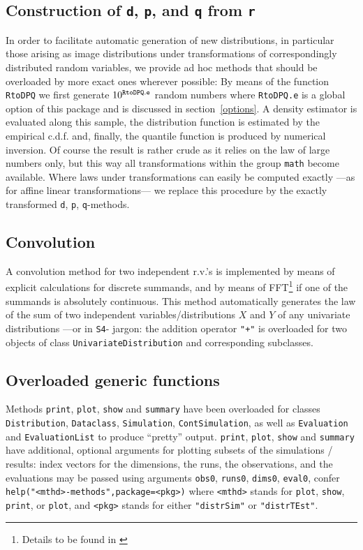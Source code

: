 \documentclass[11pt]{article}
\newcommand{\code}[1]{{\tt #1}}
\newcommand{\pkg}[1]{{\tt "#1"}}
\begin{document}
%
\subsection{Construction of \code{d}, \code{p}, and \code{q} from \code{r}}
%
In order to facilitate automatic generation of new distributions, in particular those
arising as image distributions under transformations of correspondingly distributed
random variables, we provide ad hoc methods that should be overloaded by more exact ones
wherever possible: By means of the function \code{RtoDPQ} we first generate $10^{\footnotesize\tt RtoDPQ.e}$
random numbers where \code{RtoDPQ.e} is a global option of this package and is discussed
in section~{\ref{options}}. %
A density estimator is evaluated along this sample, the distribution function is estimated
by the empirical c.d.f. and, finally, the quantile function is produced by numerical inversion.
Of course the result is rather crude as it relies on the law of large numbers only,
but this way all transformations within the group \code{math} become available.
Where laws under transformations can easily be computed exactly ---as for affine
linear transformations--- we replace this procedure by the exactly transformed
\code{d}, \code{p}, \code{q}-methods.
%
\subsection{Convolution}
%
A convolution method for two independent r.v.'s is implemented by means of explicit
calculations for discrete summands, and by means of FFT\footnote{Details to be found
in \cite{K:R:S:04}} if one of the summands is absolutely continuous.
This method automatically generates the law of the sum of two independent variables/distributions $X$ and $Y$
of any univariate distributions ---or in {\tt S4}-
jargon: the addition operator \code{"+"} is overloaded for two objects of class \code{UnivariateDistribution}
and corresponding subclasses.
%
\subsection{Overloaded generic functions}
Methods \code{print}, \code{plot}, \code{show} and \code{summary} have been overloaded for
classes \code{Distribution}, \code{Dataclass}, \code{Simulation}, \code{ContSimulation},
as well as \code{Evaluation} and \code{EvaluationList} to produce ``pretty'' 
output. %
\code{print}, \code{plot}, \code{show} and \code{summary} have additional, optional arguments
for plotting subsets of the simulations / results:
index vectors for the dimensions, the runs, the observations, and the evaluations may be passed using
arguments \code{obs0},  \code{runs0}, \code{dims0}, \code{eval0}, confer
\code{help("<mthd>-methods",package=<pkg>)} where \code{<mthd>} stands for \code{plot}, \code{show}, \code{print},
or \code{plot}, and \code{<pkg>} stands for either \pkg{distrSim} or \pkg{distrTEst}.
\end{document}
